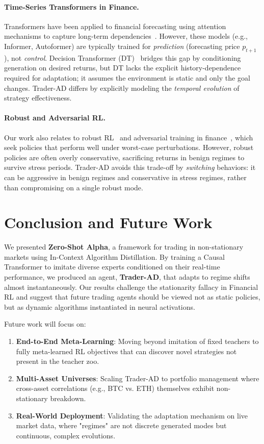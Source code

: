 \documentclass{article}
\begin{document}
\paragraph{Time-Series Transformers in Finance.}
Transformers have been applied to financial forecasting using attention mechanisms to capture long-term dependencies~\citep{lim2021temporal,zhou2021informer}. However, these models (e.g., Informer, Autoformer) are typically trained for \emph{prediction} (forecasting price $p_{t+1}$), not \emph{control}. Decision Transformer (DT)~\citep{chen2021decision} bridges this gap by conditioning generation on desired returns, but DT lacks the explicit history-dependence required for adaptation; it assumes the environment is static and only the goal changes. Trader-AD differs by explicitly modeling the \emph{temporal evolution} of strategy effectiveness.

\paragraph{Robust and Adversarial RL.}
Our work also relates to robust RL~\citep{pinto2017robust} and adversarial training in finance~\citep{xie2020deep}, which seek policies that perform well under worst-case perturbations. However, robust policies are often overly conservative, sacrificing returns in benign regimes to survive stress periods. Trader-AD avoids this trade-off by \emph{switching} behaviors: it can be aggressive in benign regimes and conservative in stress regimes, rather than compromising on a single robust mode.

\section{Conclusion and Future Work}
\label{sec:conclusion}
We presented \textbf{Zero-Shot Alpha}, a framework for trading in non-stationary markets using In-Context Algorithm Distillation. By training a Causal Transformer to imitate diverse experts conditioned on their real-time performance, we produced an agent, \textbf{Trader-AD}, that adapts to regime shifts almost instantaneously. Our results challenge the stationarity fallacy in Financial RL and suggest that future trading agents should be viewed not as static policies, but as dynamic algorithms instantiated in neural activations.

Future work will focus on:
\begin{enumerate}
    \item \textbf{End-to-End Meta-Learning}: Moving beyond imitation of fixed teachers to fully meta-learned RL objectives that can discover novel strategies not present in the teacher zoo.
    \item \textbf{Multi-Asset Universes}: Scaling Trader-AD to portfolio management where cross-asset correlations (e.g., BTC vs. ETH) themselves exhibit non-stationary breakdown.
    \item \textbf{Real-World Deployment}: Validating the adaptation mechanism on live market data, where "regimes" are not discrete generated modes but continuous, complex evolutions.
\end{enumerate}
\end{document}
